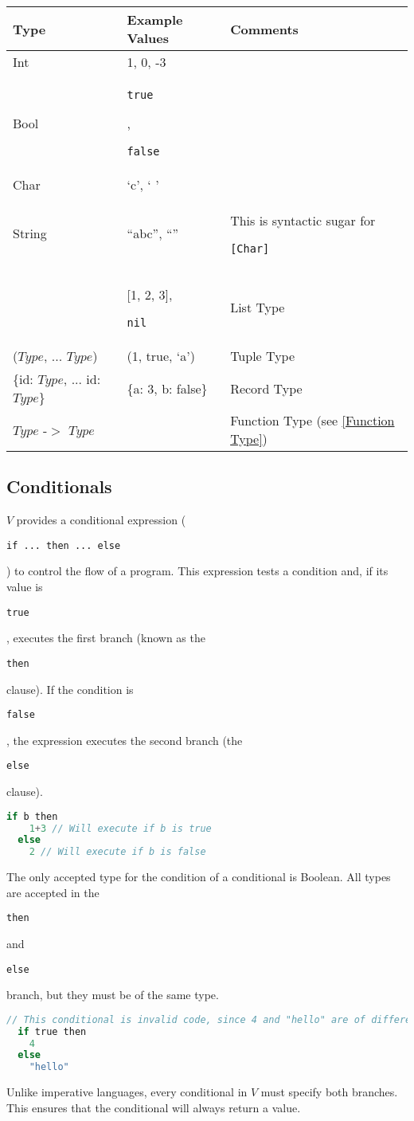 \documentclass{article}
\def\code#1{\begin{footnotesize}\texttt{#1}\end{footnotesize}}
\begin{document}
\begin{tabular}{|l|l|l|}
  \hline
  \textbf{Type} & \textbf{Example Values} & \textbf{Comments}\\
  \hline
  Int & 1, 0, -3 &\\
  \hline
  Bool & \code{true}, \code{false} &\\
  \hline
  Char & `c', ` ' &\\
  \hline
  String & ``abc'', ``'' & This is syntactic sugar for \code{[Char]}\\
  \hline
  [$Type$] & [1, 2, 3], \code{nil} & List Type\\
  \hline
  ($Type$, ... $Type$) & (1, true, `a') & Tuple Type\\
  \hline
  \{id: $Type$, ... id: $Type$\} & \{a: 3, b: false\} & Record Type\\
  \hline
  $Type$ -$>$ $Type$ & & Function Type (see \ref{Function Type})\\
  \hline
\end{tabular}

\subsection{Conditionals}

$V$ provides a conditional expression (\code{if ... then ... else}) to control the flow of a program.
This expression tests a condition and, if its value is \code{true}, executes the first branch (known as the \code{then} clause).
If the condition is \code{false}, the expression executes the second branch (the \code{else} clause).

\begin{lstlisting}[language=V]
  if b then
    1+3 // Will execute if b is true
  else
    2 // Will execute if b is false
\end{lstlisting}

The only accepted type for the condition of a conditional is Boolean.
All types are accepted in the \code{then} and \code{else} branch, but they must be of the same type.

\begin{lstlisting}[language=V]
  // This conditional is invalid code, since 4 and "hello" are of different types
  if true then
    4
  else
    "hello"
\end{lstlisting}

Unlike imperative languages, every conditional in $V$ must specify both branches.
This ensures that the conditional will always return a value.
\end{document}
